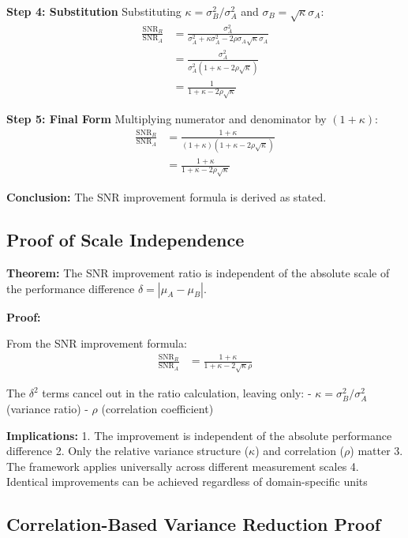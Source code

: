 \textbf{Step 4: Substitution}
Substituting $\kappa = \sigma_B^2/\sigma_A^2$ and $\sigma_B = \sqrt{\kappa}\sigma_A$:
\begin{align}
\frac{\text{SNR}_R}{\text{SNR}_A} &= \frac{\sigma_A^2}{\sigma_A^2 + \kappa\sigma_A^2 - 2\rho\sigma_A\sqrt{\kappa}\sigma_A} \\
&= \frac{\sigma_A^2}{\sigma_A^2(1 + \kappa - 2\rho\sqrt{\kappa})} \\
&= \frac{1}{1 + \kappa - 2\rho\sqrt{\kappa}}
\end{align}

\textbf{Step 5: Final Form}
Multiplying numerator and denominator by $(1 + \kappa)$:
\begin{align}
\frac{\text{SNR}_R}{\text{SNR}_A} &= \frac{1 + \kappa}{(1 + \kappa)(1 + \kappa - 2\rho\sqrt{\kappa})} \\
&= \frac{1 + \kappa}{1 + \kappa - 2\rho\sqrt{\kappa}}
\end{align}

\textbf{Conclusion:} The SNR improvement formula is derived as stated.

\subsection{Proof of Scale Independence}

\textbf{Theorem:} The SNR improvement ratio is independent of the absolute scale of the performance difference $\delta = |\mu_A - \mu_B|$.

\textbf{Proof:}

From the SNR improvement formula:
\begin{align}
\frac{\text{SNR}_R}{\text{SNR}_A} &= \frac{1 + \kappa}{1 + \kappa - 2\sqrt{\kappa}\rho}
\end{align}

The $\delta^2$ terms cancel out in the ratio calculation, leaving only:
- $\kappa = \sigma_B^2/\sigma_A^2$ (variance ratio)
- $\rho$ (correlation coefficient)

\textbf{Implications:}
1. The improvement is independent of the absolute performance difference
2. Only the relative variance structure ($\kappa$) and correlation ($\rho$) matter
3. The framework applies universally across different measurement scales
4. Identical improvements can be achieved regardless of domain-specific units

\subsection{Correlation-Based Variance Reduction Proof}

